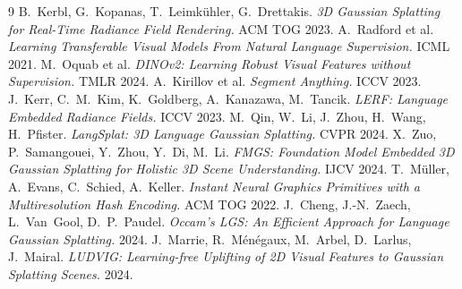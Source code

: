 \documentclass[11pt,a4paper]{article}
\begin{document}
\begin{thebibliography}{9}
 B.~Kerbl, G.~Kopanas, T.~Leimk\"uhler, G.~Drettakis.
  \emph{3D Gaussian Splatting for Real-Time Radiance Field Rendering.} ACM TOG 2023.
 A.~Radford et al. \emph{Learning Transferable Visual Models From Natural Language Supervision.} ICML 2021.
 M.~Oquab et al. \emph{DINOv2: Learning Robust Visual Features without Supervision.} TMLR 2024.
 A.~Kirillov et al. \emph{Segment Anything.} ICCV 2023.
 J.~Kerr, C.~M.~Kim, K.~Goldberg, A.~Kanazawa, M.~Tancik.
  \emph{LERF: Language Embedded Radiance Fields.} ICCV 2023.
 M.~Qin, W.~Li, J.~Zhou, H.~Wang, H.~Pfister. \emph{LangSplat: 3D Language Gaussian Splatting.} CVPR 2024.
 X.~Zuo, P.~Samangouei, Y.~Zhou, Y.~Di, M.~Li.
  \emph{FMGS: Foundation Model Embedded 3D Gaussian Splatting for Holistic 3D Scene Understanding.} IJCV 2024.
 T.~M\"uller, A.~Evans, C.~Schied, A.~Keller.
  \emph{Instant Neural Graphics Primitives with a Multiresolution Hash Encoding.} ACM TOG 2022.
 J.~Cheng, J.-N.~Zaech, L.~Van~Gool, D.~P.~Paudel.
  \emph{Occam's LGS: An Efficient Approach for Language Gaussian Splatting.} 2024.
 J.~Marrie, R.~M\'en\'egaux, M.~Arbel, D.~Larlus, J.~Mairal.
  \emph{LUDVIG: Learning-free Uplifting of 2D Visual Features to Gaussian Splatting Scenes.} 2024.
\end{thebibliography}
\end{document}
